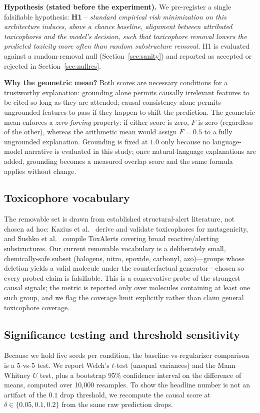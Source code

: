 \documentclass[journal]{IEEEtran}
\begin{document}
\textbf{Hypothesis (stated before the experiment).} We pre-register a single
falsifiable hypothesis: \textbf{H1} -- \emph{standard empirical risk minimization
on this architecture induces, above a chance baseline, alignment between attributed
toxicophores and the model's decision, such that toxicophore removal lowers the
predicted toxicity more often than random substructure removal.} H1 is evaluated
against a random-removal null (Section~\ref{sec:sanity}) and reported as
accepted or rejected in Section~\ref{sec:nullres}.

\textbf{Why the geometric mean?} Both scores are necessary conditions for a
trustworthy explanation: grounding alone permits causally irrelevant features to
be cited so long as they are attended; causal consistency alone permits ungrounded
features to pass if they happen to shift the prediction. The geometric mean
enforces a \emph{zero-forcing} property: if either score is zero, $F$ is zero
(regardless of the other), whereas the arithmetic mean would assign $F=0.5$ to a
fully ungrounded explanation. Grounding is fixed at $1.0$ only because no
language-model narrative is evaluated in this study; once natural-language
explanations are added, grounding becomes a measured overlap score and the same
formula applies without change.

\subsection{Toxicophore vocabulary}
The removable set is drawn from established structural-alert literature, not
chosen ad hoc: Kazius et al.~\cite{kazius2005derivation} derive and validate
toxicophores for mutagenicity, and Sushko et al.~\cite{sushko2012toxalerts}
compile ToxAlerts covering broad reactive/alerting substructures. Our current
removable vocabulary is a deliberately small, chemically-safe subset
(halogens, nitro, epoxide, carbonyl, azo)---groups whose deletion yields a valid
molecule under the counterfactual generator---chosen so every probed claim is
falsifiable. This is a conservative probe of the strongest causal signals; the
metric is reported only over molecules containing at least one such group, and we
flag the coverage limit explicitly rather than claim general toxicophore coverage.

\subsection{Significance testing and threshold sensitivity}
Because we hold five seeds per condition, the baseline-vs-regularizer comparison
is a 5-vs-5 test. We report Welch's $t$-test (unequal variances) and the
Mann--Whitney $U$ test, plus a bootstrap 95\% confidence interval on the
difference of means, computed over 10,000 resamples. To show the headline number
is not an artifact of the $0.1$ drop threshold, we recompute the causal score at
$\delta \in \{0.05, 0.1, 0.2\}$ from the same raw prediction drops.
\end{document}
